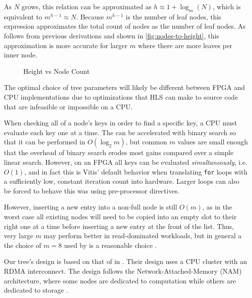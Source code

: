 As $N$ grows, this relation can be approximated as $h \approx 1 + \log_m(N)$,
which is equivalent to  $m^{h-1} \approx N$. Because $m^{h-1}$ is the number of
leaf nodes, this expression approximates the total count of nodes as the number
of leaf nodes. As follows from previous derivations and shown in
\autoref{fig:nodes-to-height}, this approximation is more accurate for larger
$m$ where there are more leaves per inner node.

\begin{figure}[H]
	\centering
	
	\caption{Height vs Node Count}
	\label{fig:nodes-to-height}
\end{figure}



The optimal choice of tree parameters will likely be different between FPGA and
CPU implementations due to optimizations that HLS can make to source code that
are infeasible or impossible on a CPU.

When checking all of a node's keys in order to find a specific key, a CPU must
evaluate each key one at a time. The can be accelerated with binary search so
that it can be performed in $O(\log_2 m)$, but common $m$ values are small
enough that the overhead of binary search erodes most gains compared over a
simple linear search.
%
However, on an FPGA all keys can be evaluated \emph{simultaneously}, i.e.
$O(1)$, and in fact this is Vitis' default behavior when translating
\texttt{for} loops with a sufficiently low, constant iteration count into
hardware. Larger loops can also be forced to behave this was using pre-processor
directives.

However, inserting a new entry into a non-full node is still $O(m)$, as in the
worst case all existing nodes will need to be copied into an empty slot to their
right one at a time before inserting a new entry at the front of the list. Thus,
very large $m$ may perform better in read-dominated workloads, but in general a
the choice of $m=8$ used by \citeauthor{ren-fpl-2019} is a reasonable choice
\autocite{ren-fpl-2019}.


\label{subsec:concurrency}

Our tree's design is based on that of \citeauthor{base} in .
Their design uses a CPU cluster with an RDMA interconnect. The design follows
the Network-Attached-Memory (NAM) architecture, where some nodes are dedicated
to computation while others are dedicated to storage
\autocite{base,binnig-vldb-2016}.


